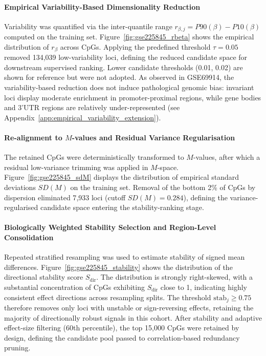 \paragraph{Empirical Variability-Based Dimensionality Reduction}

Variability was quantified via the inter-quantile range 
$r_{\beta,j} = P90(\beta) - P10(\beta)$ computed on the 
training set. Figure~\ref{fig:gse225845_rbeta} 
shows the empirical distribution of $r_{\beta}$ across CpGs. 
Applying the predefined threshold $\tau = 0.05$ removed 
134{,}039 low-variability loci, defining the reduced candidate 
space for downstream supervised ranking. Lower candidate 
thresholds (0.01, 0.02) are shown for reference but were not 
adopted. As observed in GSE69914, the variability-based reduction does 
not induce pathological genomic bias: invariant loci display 
moderate enrichment in promoter-proximal regions, while gene 
bodies and 3'UTR regions are relatively under-represented 
(see Appendix~\ref{app:empirical_variability_extension}).


\paragraph{Re-alignment to $M$-values and Residual Variance Regularisation}

The retained CpGs were deterministically transformed to 
$M$-values, after which a residual low-variance trimming 
was applied in $M$-space. 
Figure~\ref{fig:gse225845_sdM} displays the distribution of 
empirical standard deviations $SD(M)$ on the training set.
Removal of the bottom 2\% of CpGs by dispersion eliminated  
7{,}933 loci (cutoff $SD(M)=0.284$), defining the 
variance-regularised candidate space entering the 
stability-ranking stage.
\paragraph{Biologically Weighted Stability Selection and Region-Level Consolidation}

Repeated stratified resampling was used to estimate stability 
of signed mean differences. Figure~\ref{fig:gse225845_stability} 
shows the distribution of the directional stability score 
$S_{\mathrm{dir}}$.
The distribution is strongly right-skewed, with a substantial 
concentration of CpGs exhibiting $S_{\mathrm{dir}}$ close to 1, 
indicating highly consistent effect directions across resampling splits. 
The threshold $\mathrm{stab}_j \geq 0.75$ therefore removes only loci 
with unstable or sign-reversing effects, retaining the majority 
of directionally robust signals in this cohort.
After stability and adaptive effect-size filtering 
(60th percentile), the top 15{,}000 CpGs were retained by design, 
defining the candidate pool passed to correlation-based 
redundancy pruning.

